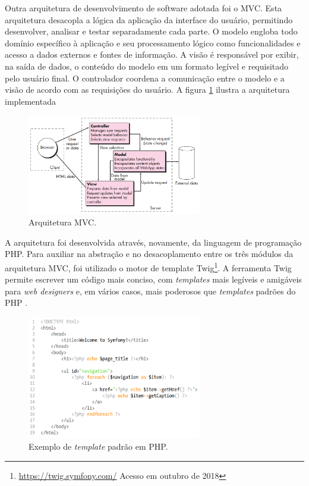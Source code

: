 \documentclass[cic,tc]{iiufrgs}
\begin{document}
Outra arquitetura de desenvolvimento de software adotada foi o MVC. Esta arquitetura desacopla a lógica da aplicação da interface do usuário, permitindo desenvolver, analisar e testar separadamente cada parte. O modelo engloba todo domínio específico à aplicação e seu processamento lógico como funcionalidades e acesso a dados externos e fontes de informação. A visão é responsável por exibir, na saída de dados, o conteúdo do modelo em um formato legível e requisitado pelo usuário final. O controlador coordena a comunicação entre o modelo e a visão de acordo com as requisições do usuário. A figura \ref{dataMVCArchitecture} ilustra a arquitetura implementada

\begin{figure}[ht]
    \caption{Arquitetura MVC.}
        \begin{center}
            \includegraphics[width=0.68\textwidth]{arquitetura-mvc.png}
        \end{center}
    \label{dataMVCArchitecture}
\end{figure}

A arquitetura foi desenvolvida através, novamente, da linguagem de programação PHP. Para auxiliar na abstração e no desacoplamento entre os três módulos da arquitetura MVC, foi utilizado o motor de template Twig\footnote{\url{https://twig.symfony.com/} Acesso em outubro de 2018}. A ferramenta Twig  permite escrever um código mais conciso, com \textit{templates} mais legíveis e amigáveis para \textit{web designers} e, em vários casos, mais poderosos que \textit{templates} padrões do PHP \cite{symfonyBook}.

\begin{figure}[ht]
    \caption{Exemplo de \textit{template} padrão em PHP.}
        \begin{center}
            \includegraphics[width=0.68\textwidth]{twig-php.png}
        \end{center}
    \label{codeTemplatePHP}
\end{figure}
\end{document}
